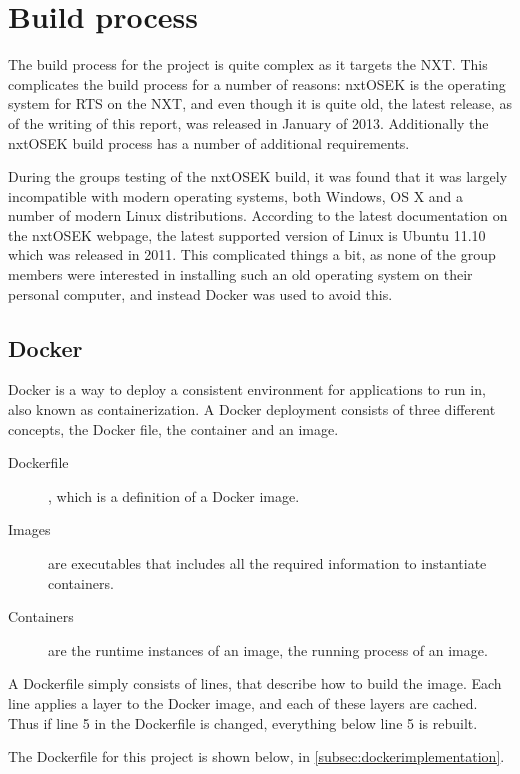 \section{Build process}\label{sec:buildprocess}
The build process for the project is quite complex as it targets the NXT.
This complicates the build process for a number of reasons:
nxtOSEK is the operating system for RTS on the NXT, and even though it is quite old, the latest release, as of the writing of this report, was released in January of 2013\cite{osekrelease}.
Additionally the nxtOSEK build process has a number of additional requirements.

During the groups testing of the nxtOSEK build, it was found that it was largely incompatible with modern operating systems, both Windows, OS X and a number of modern Linux distributions.
According to the latest documentation on the nxtOSEK webpage, the latest supported version of Linux is Ubuntu 11.10 which was released in 2011.
This complicated things a bit, as none of the group members were interested in installing such an old operating system on their personal computer, and instead Docker was used to avoid this.

\subsection{Docker}\label{subsec:docker}
Docker is a way to deploy a consistent environment for applications to run in, also known as containerization\cite{dockerdocstart}.
A Docker deployment consists of three different concepts, the Docker file, the container and an image.
\begin{description}
    \item [Dockerfile], which is a definition of a Docker image.
    \item [Images] are executables that includes all the required information to instantiate containers.
    \item[Containers] are the runtime instances of an image, the running process of an image.
\end{description}

A Dockerfile simply consists of lines, that describe how to build the image.
Each line applies a layer to the Docker image, and each of these layers are cached.
Thus if line 5 in the Dockerfile is changed, everything below line 5 is rebuilt.

The Dockerfile for this project is shown below, in \autoref{subsec:dockerimplementation}.

